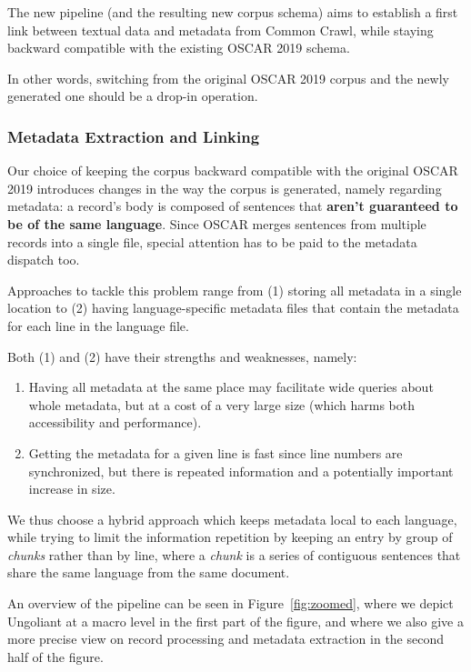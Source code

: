 The new pipeline (and the resulting new corpus schema) aims to establish a first link between textual data and metadata from Common Crawl, while staying backward compatible with the existing OSCAR 2019 schema.

In other words, switching from the original OSCAR 2019 corpus and the newly generated one should be a drop-in operation.

\subsubsection{Metadata Extraction and Linking}
Our choice of keeping the corpus backward compatible with the original OSCAR 2019 introduces changes in the way the corpus is generated, namely regarding metadata: a record's body is composed of sentences that \textbf{aren't guaranteed to be of the same language}. Since OSCAR merges sentences from multiple records into a single file, special attention has to be paid to the metadata dispatch too.

Approaches to tackle this problem range from (1) storing all metadata in a single location to (2) having language-specific metadata files that contain the metadata for each line in the language file.

Both (1) and (2) have their strengths and weaknesses, namely:
\begin{enumerate}
    \item Having all metadata at the same place may facilitate wide queries about whole metadata, but at a cost of a very large size (which harms both accessibility and performance).
    \item Getting the metadata for a given line is fast since line numbers are synchronized, but there is repeated information and a potentially important increase in size.
\end{enumerate}

We thus choose a hybrid approach which keeps metadata local to each language, while trying to limit the information repetition by keeping an entry by group of \emph{chunks} rather than by line, where a \emph{chunk} is a series of contiguous sentences that share the same language from the same document.

An overview of the pipeline can be seen in Figure~\ref{fig:zoomed}, where we depict Ungoliant at a macro level in the first part of the figure, and where we also give a more precise view on record processing and metadata extraction in the second half of the figure.

